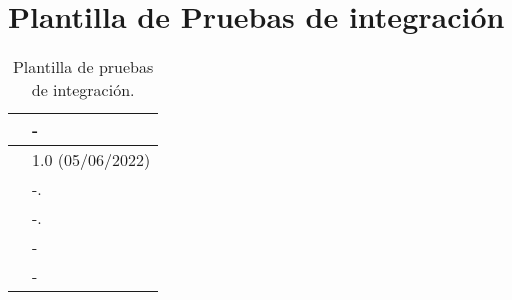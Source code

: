 \section{Plantilla de Pruebas de integración}

\begin{table}[H]
\begin{center}
\begin{tabular}{|p{3cm}|p{10cm}|} \hline
\centering {\bf PI-XX} & -  \\ \hline\hline
\centering {\bf Versión} & 1.0 (05/06/2022) \\ \hline
\centering {\bf Dependencias} &  -. \\ \hline
\centering {\bf Descripción} &  -. \\ \hline
\centering {\bf Criterio de aceptación} & - \\ \hline
\centering {\bf Estado} & - \\ \hline
\end{tabular}
\caption{Plantilla de pruebas de integración.}
\label{enlacePIX}
\end{center}
\end{table}